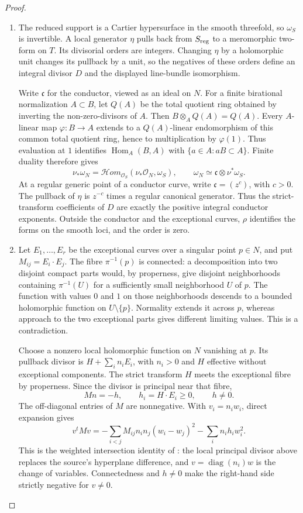 \begin{proof}
\begin{enumerate}[label=\arabic*.,leftmargin=*]
\item The reduced support is a Cartier hypersurface in the smooth
threefold, so $\omega_S$ is invertible. A local generator $\eta$
pulls back from $S_{\rm reg}$ to a meromorphic two-form on $T$.
Its divisorial orders are integers. Changing $\eta$ by a holomorphic
unit changes its pullback by a unit, so the negatives of these
orders define an integral divisor $D$ and the displayed
line-bundle isomorphism.

Write $\mathfrak c$ for the conductor, viewed as an ideal on $N$.
For a finite birational normalization $A\subset B$, let $Q(A)$
be the total quotient ring obtained by inverting the non-zero-divisors
of $A$. Then $B\otimes_A Q(A)=Q(A)$. Every $A$-linear map
$\varphi:B\to A$ extends to a $Q(A)$-linear endomorphism of this
common total quotient ring, hence to multiplication by $\varphi(1)$.
Thus evaluation at $1$ identifies $\operatorname{Hom}_A(B,A)$ with
$\{a\in A:aB\subset A\}$. Finite duality therefore gives
\[
 \nu_*\omega_N
   =\mathcal Hom_{\mathcal O_S}(\nu_*\mathcal O_N,\omega_S),
 \qquad
 \omega_N\simeq\mathfrak c\otimes\nu^*\omega_S.
\]
At a regular generic point of a conductor curve, write
$\mathfrak c=(z^c)$, with $c>0$. The pullback of $\eta$ is
$z^{-c}$ times a regular canonical generator. Thus the
strict-transform coefficients of $D$ are exactly the positive
integral conductor exponents. Outside the conductor and the
exceptional curves, $\rho$ identifies the forms on the smooth
loci, and the order is zero.

\item Let $E_1,\ldots,E_r$ be the exceptional curves over a singular
point $p\in N$, and put $M_{ij}=E_i\cdot E_j$.
The fibre $\pi^{-1}(p)$ is connected: a decomposition into two
disjoint compact parts would, by properness, give disjoint
neighborhoods containing $\pi^{-1}(U)$ for a sufficiently small
neighborhood $U$ of $p$. The function with values $0$ and $1$
on those neighborhoods descends to a bounded holomorphic function
on $U\setminus\{p\}$. Normality extends it across $p$, whereas
approach to the two exceptional parts gives different limiting
values. This is a contradiction.

Choose a nonzero local holomorphic function on $N$ vanishing at
$p$. Its pullback divisor is $H+\sum_i n_iE_i$, with $n_i>0$
and $H$ effective without exceptional components. The strict
transform $H$ meets the exceptional fibre by properness. Since
the divisor is principal near that fibre,
\[
 Mn=-h,\qquad h_i=H\cdot E_i\ge0,\qquad h\ne0.
\]
The off-diagonal entries of $M$ are nonnegative. With
$v_i=n_iw_i$, direct expansion gives
\[
 v^tMv
 =-\sum_{i<j}M_{ij}n_in_j(w_i-w_j)^2
   -\sum_i n_ih_iw_i^2.
\]
This is the weighted intersection identity of
\cite[p.~6]{Mumford1961}: the local principal divisor above
replaces the source's hyperplane difference, and
$v=\operatorname{diag}(n_i)w$ is the change of variables.
Connectedness and $h\ne0$ make the right-hand side strictly
negative for $v\ne0$.


\end{enumerate}
\end{proof}
